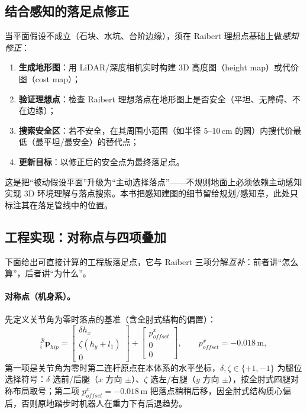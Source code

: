 \subsection{结合感知的落足点修正}
\label{subsec:qg-perception}

当平面假设不成立（石块、水坑、台阶边缘），须在 Raibert 理想点基础上做\emph{感知修正}\cite{unitree2023quadruped}：
\begin{enumerate}
  \item \textbf{生成地形图}：用 LiDAR/深度相机实时构建 $3$D 高度图（height map）或代价图（cost map）；
  \item \textbf{验证理想点}：检查 Raibert 理想落点在地形图上是否安全（平坦、无障碍、不在边缘）；
  \item \textbf{搜索安全区}：若不安全，在其周围小范围（如半径 $5$–$10\,\mathrm{cm}$ 的圆）内搜代价最低（最平坦/最安全）的替代点；
  \item \textbf{更新目标}：以修正后的安全点为最终落足点。
\end{enumerate}
这是把“被动假设平面”升级为“主动选择落点”——不规则地面上必须依赖主动感知实现 $3$D 环境理解与落点搜索。本书把感知建图的细节留给规划/感知章，此处只标注其在落足管线中的位置。

\subsection{工程实现：对称点与四项叠加}
\label{subsec:qg-engineering-foot}

下面给出可直接计算的工程版落足点，它与 Raibert 三项分解\emph{互补}：前者讲“怎么算”，后者讲“为什么”。

\paragraph{对称点（机身系）。}
先定义关节角为零时落点的基准（含全肘式结构的偏置）\cite{yu2021quadruped}：
\begin{equation}
  {}_i^{\mathcal{B}}\boldsymbol{p}_{hip}=
  \begin{bmatrix}\delta h_x \\ \zeta(h_y+l_1) \\ 0\end{bmatrix}
  +\begin{bmatrix}p_{offset}^{x} \\ 0 \\ 0\end{bmatrix},
  \qquad p_{offset}^{x}=-0.018\,\mathrm{m},
  \label{eq:qg-symmetric}
\end{equation}
第一项是关节角为零时第二连杆原点在本体系的水平坐标，$\delta,\zeta\in\{+1,-1\}$ 为腿位选择符号：$\delta$ 选前/后腿（$x$ 方向 $\pm$）、$\zeta$ 选左/右腿（$y$ 方向 $\pm$），按全肘式四腿对称布局取号；第二项 $p_{offset}^{x}=-0.018\,\mathrm{m}$ 把落点稍稍后移，因全肘式结构质心偏后，否则原地踏步时机器人在重力下有后退趋势\cite{yu2021quadruped}。

